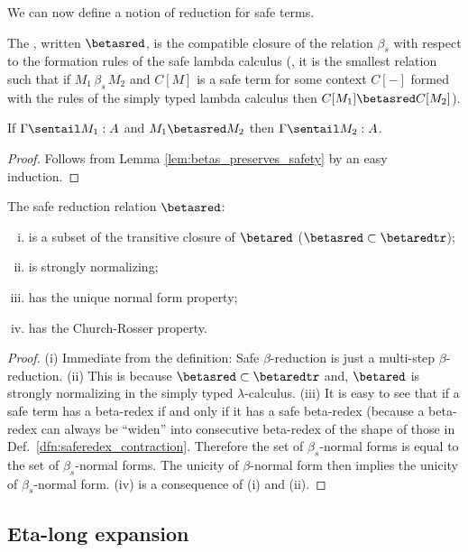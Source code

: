 We can now define a notion of reduction for safe terms.
\begin{definition}\rm
The , written $\betasred$, is the
compatible closure of the relation $\beta_s$ with respect to the
formation rules of the safe lambda calculus (\ie, it is the smallest relation such that
if $M_1\, \beta_s\, M_2$ and $C[M]$ is a safe term for some context $C[-]$ formed with the rules of the simply typed lambda calculus then $C[M_1]\betasred C[M_2]$).
\end{definition}

\begin{lemma}
\label{lem:safered_preserves_safety}
If $\Gamma \sentail M_1 :A$ and $M_1\betasred M_2$ then $\Gamma \sentail M_2 :A$.
\end{lemma}
\begin{proof}
Follows from Lemma \ref{lem:betas_preserves_safety} by an easy induction.
\end{proof}


\begin{lemma} The safe reduction relation $\betasred$:
\begin{enumerate}[(i)]
\item is a subset of the transitive closure of $\betared$ ($\betasred \subset \betaredtr$);
\item is strongly normalizing;
\item has the unique normal form property;
\item has the Church-Rosser property.
\end{enumerate}
\end{lemma}
\begin{proof}
(i) Immediate from the definition: Safe $\beta$-reduction is just a multi-step $\beta$-reduction.
(ii) This is because $\betasred \subset \betaredtr$ and, $\betared$ is
strongly normalizing in the simply typed $\lambda$-calculus. (iii) It is easy to see that if a safe term has a beta-redex if and only if it has a safe beta-redex (because a beta-redex can always be ``widen'' into consecutive beta-redex of the shape of those in Def.~\ref{dfn:saferedex_contraction}. Therefore the set
of $\beta_s$-normal forms is equal to the set of $\beta_s$-normal
forms. The unicity of $\beta$-normal form then implies the unicity
of $\beta_s$-normal form. (iv) is a consequence of (i) and (ii).
\end{proof}

\subsection*{Eta-long expansion}

